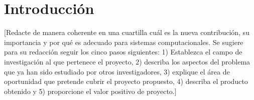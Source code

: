 \chapter*{Introducción}\label{introduccion}

[Redacte de manera coherente en una cuartilla cuál es la nueva contribución, su importancia y por qué es adecuado para sistemas computacionales. Se sugiere para su redacción seguir los cinco pasos siguientes: 1) Establezca el campo de investigación al que pertenece el proyecto, 2) describa los aspectos del problema que ya han sido estudiado por otros investigadores, 3) explique el área de oportunidad que pretende cubrir el proyecto propuesto, 4) describa el producto obtenido y 5) proporcione el valor positivo de proyecto.]

